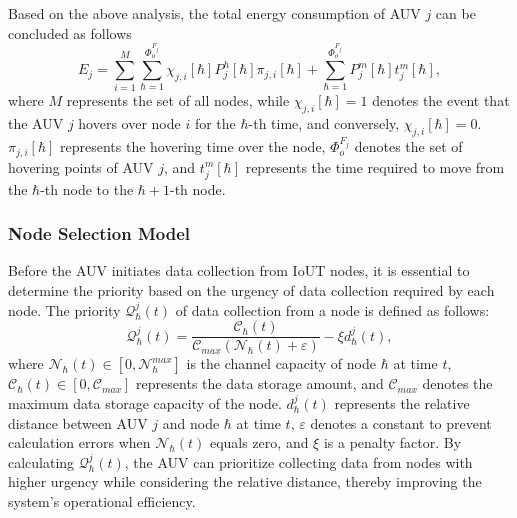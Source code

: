\documentclass{article}
\begin{document}
Based on the above analysis, the total energy consumption of AUV $j$ can be concluded as follows
\begin{equation}\label{eq:16}
E_{j}=\sum_{i=1}^{M}\sum_{\hbar=1}^{\Phi_{o}^{F_{j}}}\chi_{j,i} [\hbar]P_{j}^{h}[\hbar]\pi_{j,i}[\hbar]+\sum_{\hbar=1}^{\Phi_{o}^{F_{j}}}P_{j}^{m}[\hbar]t_{j}^{m}[\hbar],
\end{equation}
where $M$ represents the set of all nodes, while $\chi_{j,i}[\hbar]=1$ denotes the event that the AUV $j$ hovers over node $i$ for the $\hbar$-th time, and conversely, $\chi_{j,i}[\hbar]=0$. $\pi_{j,i}[\hbar]$ represents the hovering time over the node, $\Phi_{o}^{F_{j}}$ denotes the set of hovering points of AUV $j$, and $t_{j}^{m}[\hbar]$ represents the time required to move from the $\hbar$-th node to the $\hbar+1$-th node.

\subsubsection{Node Selection Model}
Before the AUV initiates data collection from IoUT nodes, it is essential to determine the priority based on the urgency of data collection required by each node. The priority $\mathcal{Q}_{\hbar}^{j}(t)$ of data collection from a node is defined as follows:
\begin{equation}\mathcal{Q}_{\hbar}^{j}(t)=\frac{\mathcal{C}_{\hbar}(t)}{\mathcal{C}_{max}(\mathcal{N}_{\hbar}(t)+\varepsilon)}-\xi d_{\hbar}^{j}(t),\end{equation}
where $\mathcal{N}_{\hbar}(t)\in[0,\mathcal{N}_{\hbar}^{max}]$ is the channel capacity of node $\hbar$ at time $t$, $\mathcal{C}_\hbar(t)\in[0,\mathcal{C}_{max}]$ represents the data storage amount, and $\mathcal{C}_{max}$ denotes the maximum data storage capacity of the node. $d_{\hbar}^{j}(t)$ represents the relative distance between AUV $j$ and node $\hbar$ at time $t$, $\varepsilon$ denotes a constant to prevent calculation errors when $\mathcal{N}_{\hbar}(t)$ equals zero, and $\xi$ is a penalty factor. By calculating $\mathcal{Q}_{\hbar}^{j}(t)$, the AUV can prioritize collecting data from nodes with higher urgency while considering the relative distance, thereby improving the system's operational efficiency.
\end{document}
